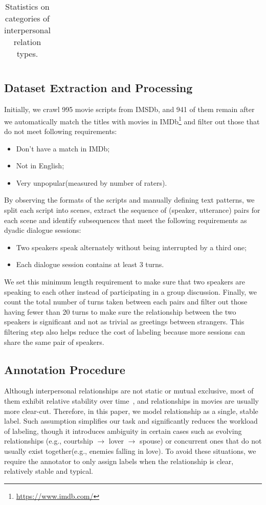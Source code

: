 \begin{table*}[t]
\begin{tabular}{@{}lllrrrrrr@{}}
		\bottomrule[1.5pt]
		
	\end{tabular}
	\caption{Statistics on categories of interpersonal relation types.}
	\label{table:relationtypes}
\end{table*}

\subsection{Dataset Extraction and Processing}
Initially, we crawl 995 movie scripts from IMSDb, and 941 of them remain after we automatically match the titles with movies in IMDb\footnote{\url{https://www.imdb.com/}} and filter out those that do not meet following requirements:
\begin{itemize}
	\item Don't have a match in IMDb; 
	\item Not in English; 
	\item Very unpopular(measured by number of raters). 
\end{itemize}

By observing the formats of the scripts and manually defining text patterns, 
we split each script into scenes, extract the sequence of (speaker, utterance) 
pairs for each scene and identify subsequences that meet the following requirements  
as dyadic dialogue sessions: 
\begin{itemize}
	\item Two speakers speak alternately without being interrupted by a third one; 
	\item Each dialogue session contains at least 3 turns. 
\end{itemize}

We set this minimum length requirement to make sure that two speakers are speaking to each other instead of participating in a group discussion. Finally, we count the total number of turns taken between each pairs and filter out those having fewer than 20 turns to make sure the relationship between the two speakers is significant and not as trivial as greetings between strangers. This filtering step also helps reduce the cost of labeling because more sessions can share the same pair of speakers.

\subsection{Annotation Procedure}
Although interpersonal relationships are not static or mutual exclusive, most of them exhibit relative stability over time~\cite{gadde1987stability}, and relationships in movies are usually more clear-cut. Therefore, in this paper, we model relationship as a single, stable label. Such assumption simplifies our task and significantly reduces the workload of labeling, though it introduces 
ambiguity in certain cases such as evolving relationships (e.g., courtship $\rightarrow$ lover $\rightarrow$ spouse) or concurrent ones that do not usually exist together(e.g., enemies falling in love). To avoid these situations, we require the annotator to only assign labels when the relationship is clear, relatively stable and typical.

